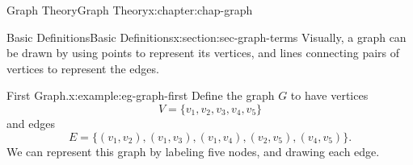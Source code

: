 \documentclass[oneside,10pt,]{book}
\numberwithin{equation}{section}
\begin{document}
\begin{chapterptx}{Graph Theory}{}{Graph Theory}{}{}{x:chapter:chap-graph}
\begin{sectionptx}{Basic Definitions}{}{Basic Definitions}{}{}{x:section:sec-graph-terms}
Visually, a graph can be drawn by using points to represent its vertices, and lines connecting pairs of vertices to represent the edges.%
\begin{example}{First Graph.}{x:example:eg-graph-first}%
Define the graph \(G\) to have vertices%
\begin{equation*}
V = \{v_1,v_2,v_3,v_4,v_5\}
\end{equation*}
and edges%
\begin{equation*}
E = \{(v_1,v_2),(v_1,v_3),(v_1,v_4),(v_2,v_5),(v_4,v_5)\}\text{.}
\end{equation*}
We can represent this graph by labeling five nodes, and drawing each edge.%
\begin{sidebyside}{1}{0.375}{0.375}{0}%
\begin{sbspanel}{0.25}%
\end{sbspanel}
\end{sidebyside}
\end{example}
\end{sectionptx}
\end{chapterptx}
\end{document}

